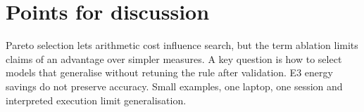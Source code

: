 \documentclass[11pt,a4paper]{article}
\theoremstyle{definition}
\theoremstyle{plain}
\theoremstyle{remark}
\begin{document}
\section{Points for discussion}
Pareto selection lets arithmetic cost influence search, but the term ablation limits claims of an advantage over simpler measures. A key question is how to select models that generalise without retuning the rule after validation. E3 energy savings do not preserve accuracy. Small examples, one laptop, one session and interpreted execution limit generalisation. 


\end{document}

